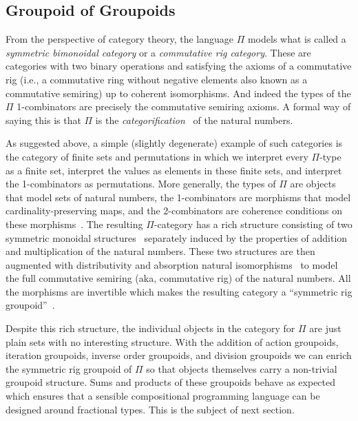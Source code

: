 
\subsection{Groupoid of Groupoids}

From the perspective of category theory, the language $\Pi$ models
what is called a \emph{symmetric bimonoidal category} or a
\emph{commutative rig category}. These are categories with two binary
operations and satisfying the axioms of a commutative rig (i.e., a
commutative ring without negative elements also known as a commutative
semiring) up to coherent isomorphisms. And indeed the types of the
$\Pi$ 1-combinators are precisely the commutative semiring axioms. A
formal way of saying this is that $\Pi$ is the
\emph{categorification}~\cite{math/9802029} of the natural numbers. 

As suggested above, a simple (slightly degenerate) example of such
categories is the category of finite sets and permutations in which we
interpret every $\Pi$-type as a finite set, interpret the values as
elements in these finite sets, and interpret the 1-combinators as
permutations. More generally, the types of $\Pi$ are objects that
model sets of natural numbers, the 1-combinators are morphisms that
model cardinality-preserving maps, and the 2-combinators are coherence
conditions on these morphisms~\cite{Carette2016}. The resulting
$\Pi$-category has a rich structure consisting of two symmetric
monoidal structures~\cite{nla.cat-vn1051288} separately induced by the
properties of addition and multiplication of the natural
numbers. These two structures are then augmented with distributivity
and absorption natural isomorphisms~\cite{laplaza} to model the full
commutative semiring (aka, commutative rig) of the natural
numbers. All the morphisms are invertible which makes the resulting
category a ``symmetric rig groupoid''~\cite{nlabrig}.

Despite this rich structure, the individual objects in the category
for $\Pi$ are just plain sets with no interesting structure. With the
addition of action groupoids, iteration groupoids, inverse order
groupoids, and division groupoids we can enrich the symmetric rig
groupoid of $\Pi$ so that objects themselves carry a non-trivial
groupoid structure. Sums and products of these groupoids behave as
expected which ensures that a sensible compositional programming
language can be designed around fractional types. This is the subject
of next section.

